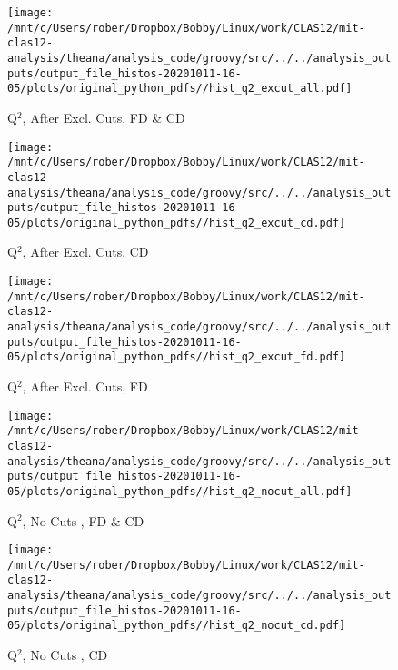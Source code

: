 \documentclass{article}
\begin{document}
\begin{landscape}
\begin{figure}[h]
        \texttt{[image: /mnt/c/Users/rober/Dropbox/Bobby/Linux/work/CLAS12/mit-clas12-analysis/theana/analysis\_code/groovy/src/../../analysis\_outputs/output\_file\_histos-20201011-16-05/plots/original\_python\_pdfs//hist\_q2\_excut\_all.pdf]}
        \captionsetup{textformat=empty,labelformat=blank}
        \caption{Q$^{2}$, After Excl. Cuts, FD \& CD}
    \end{figure}
    \clearpage
    
    \begin{figure}[h]
        \centering

        \texttt{[image: /mnt/c/Users/rober/Dropbox/Bobby/Linux/work/CLAS12/mit-clas12-analysis/theana/analysis\_code/groovy/src/../../analysis\_outputs/output\_file\_histos-20201011-16-05/plots/original\_python\_pdfs//hist\_q2\_excut\_cd.pdf]}
        \captionsetup{textformat=empty,labelformat=blank}
        \caption{Q$^{2}$, After Excl. Cuts, CD}
    \end{figure}
    \clearpage
    
    \begin{figure}[h]
        \centering

        \texttt{[image: /mnt/c/Users/rober/Dropbox/Bobby/Linux/work/CLAS12/mit-clas12-analysis/theana/analysis\_code/groovy/src/../../analysis\_outputs/output\_file\_histos-20201011-16-05/plots/original\_python\_pdfs//hist\_q2\_excut\_fd.pdf]}
        \captionsetup{textformat=empty,labelformat=blank}
        \caption{Q$^{2}$, After Excl. Cuts, FD}
    \end{figure}
    \clearpage
    
    \begin{figure}[h]
        \centering

        \texttt{[image: /mnt/c/Users/rober/Dropbox/Bobby/Linux/work/CLAS12/mit-clas12-analysis/theana/analysis\_code/groovy/src/../../analysis\_outputs/output\_file\_histos-20201011-16-05/plots/original\_python\_pdfs//hist\_q2\_nocut\_all.pdf]}
        \captionsetup{textformat=empty,labelformat=blank}
        \caption{Q$^{2}$, No Cuts , FD \& CD}
    \end{figure}
    \clearpage
    
    \begin{figure}[h]
        \centering

        \texttt{[image: /mnt/c/Users/rober/Dropbox/Bobby/Linux/work/CLAS12/mit-clas12-analysis/theana/analysis\_code/groovy/src/../../analysis\_outputs/output\_file\_histos-20201011-16-05/plots/original\_python\_pdfs//hist\_q2\_nocut\_cd.pdf]}
        \captionsetup{textformat=empty,labelformat=blank}
        \caption{Q$^{2}$, No Cuts , CD}
    \end{figure}
    \clearpage
    

\end{landscape}
\end{document}
